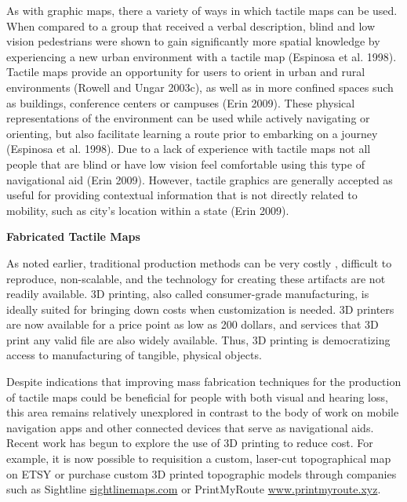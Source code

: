 As with graphic maps, there a variety of ways in which tactile maps can be used.  When compared to a group that received a verbal description, blind and low vision pedestrians were shown to gain significantly more spatial knowledge by experiencing a new urban environment with a tactile map (Espinosa et al. 1998).   Tactile maps provide an opportunity for users to orient in urban and rural environments (Rowell and Ungar 2003c), as well as in more confined spaces such as buildings, conference centers or campuses (Erin 2009).  These physical representations of the environment can be used while actively navigating or orienting, but also facilitate learning a route prior to embarking on a journey (Espinosa et al. 1998).  Due to a lack of experience with tactile maps not all people that are blind or have low vision feel comfortable using this type of navigational aid (Erin 2009).  However, tactile graphics are generally accepted as useful for providing contextual information that is not directly related to mobility, such as city’s location within a state (Erin 2009).

\textbf{Fabricated Tactile Maps}

As noted earlier, traditional production methods can be very costly \cite{rice2005design}, difficult to reproduce, non-scalable, and the technology for creating these artifacts are not readily available. 3D printing, also called consumer-grade manufacturing, is ideally suited for bringing  down costs when customization is needed. 3D printers are now available for a price point  as low as 200 dollars, and services that 3D print any valid file are also widely available. Thus,  3D printing is democratizing access to manufacturing of tangible, physical objects. 


Despite  indications that improving mass fabrication techniques for the production of tactile maps 
could be beneficial for people with both visual and hearing loss, this area remains relatively unexplored in contrast to the body of work on mobile navigation apps and other connected devices that serve as navigational aids. Recent work has begun to explore the use of 3D 
printing to reduce cost. 
For example, it is now possible to requisition a custom, laser-cut topographical map on ETSY \cite{etsy} or purchase custom 3D printed topographic models through companies such as Sightline \url{sightlinemaps.com} or PrintMyRoute \url{www.printmyroute.xyz}. 

